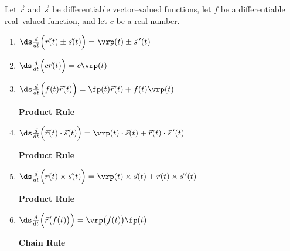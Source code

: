 
{Let $\vec r$ and $\vec s$ be differentiable vector--valued functions, let $f$ be a differentiable real--valued function, and let $c$ be a real number.
\begin{enumerate}
	\item $\ds \frac{d}{dt}\Big(\vec r(t) \pm \vec s(t)\Big) = \vrp(t) \pm \vec s\,'(t)$
	\item $\ds \frac{d}{dt}\Big(c\vec r(t)\Big) = c\vrp(t)$
	\item \parbox{200pt}{$\ds \frac{d}{dt}\Big(f(t)\vec r(t)\Big) = \fp(t)\vec r(t) + f(t)\vrp(t)$} \textbf{Product Rule}
	\item \parbox{200pt}{$\ds \frac{d}{dt}\Big(\vec r(t)\cdot \vec s(t) \Big) = \vrp(t)\cdot \vec s(t) + \vec r(t)\cdot \vec s\,'(t)$} \textbf{Product Rule}
	\item\label{crossprodrule} \parbox{200pt}{$\ds \frac{d}{dt}\Big(\vec r(t)\times \vec s(t) \Big) = \vrp(t)\times \vec s(t) + \vec r(t)\times \vec s\,'(t)$} \textbf{Product Rule}
	\item \parbox{200pt}{$\ds \frac{d}{dt}\Big(\vec r\big(f(t)\big)\Big) = \vrp\big(f(t)\big)\fp(t)$}  \textbf{Chain Rule}
\end{enumerate}}

